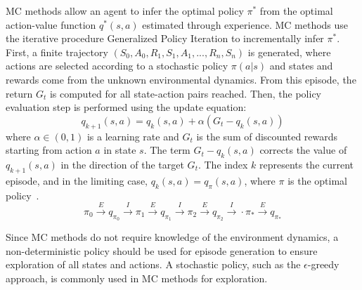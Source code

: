 \documentclass[../xlapes02]{subfiles}
\begin{document}
    MC methods allow an agent to infer the optimal policy $\pi^*$ from the optimal action-value function $q^*(s,a)$ estimated through experience. MC methods use the iterative procedure Generalized Policy Iteration to incrementally infer $\pi^*$. First, a finite trajectory $(S_0, A_0, R_1, S_1, A_1, ..., R_n, S_n)$ is generated, where actions are selected according to a stochastic policy $\pi(a|s)$ and states and rewards come from the unknown environmental dynamics. From this episode, the return $G_t$ is computed for all state-action pairs reached. Then, the policy evaluation step is performed using the update equation:
    \begin{equation}
        \label{eq:mc}
        q_{k+1}(s, a) = q_k(s, a) + \alpha(G_t - q_k(s, a))
    \end{equation}
    where $\alpha \in (0,1)$ is a learning rate and $G_t$ is the sum of discounted rewards starting from action $a$ in state $s$. The term $G_t - q_k(s, a)$ corrects the value of $q_{k+1}(s,a)$ in the direction of the target $G_t$. The index $k$ represents the current episode, and in the limiting case, $q_k(s,a) = q_{\pi}(s,a)$, where $\pi$ is the optimal policy~\cite{sutton2018reinforcement}.
    \begin{equation}
        \pi_0 \xrightarrow{E} q_{\pi_0} \xrightarrow{I}
        \pi_1 \xrightarrow{E} q_{\pi_1} \xrightarrow{I}
        \pi_2 \xrightarrow{E} q_{\pi_2} \xrightarrow{I}
        \cdot
        \pi_* \xrightarrow{E} q_{\pi_*}
    \end{equation}



    Since MC methods do not require knowledge of the environment dynamics, a non-deterministic policy should be used for episode generation to ensure exploration of all states and actions. A stochastic policy, such as the $\epsilon$-greedy approach, is commonly used in MC methods for exploration.
\end{document}
